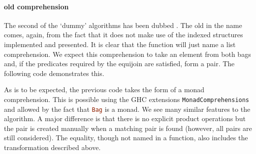 \paragraph{old comprehension} The second of the `dummy' algorithms has been
dubbed \oldcomprehension{}. The old in the name comes, again, from the fact that
it does not make use of the indexed structures implemented and presented. It is
clear that the function will just name a list comprehension. We expect this
comprehension to take an element from both bags and, if the predicates required
by the equijoin are satisfied, form a pair. The following code demonstrates
this.



\noindent
As is to be expected, the previous code takes the form of a monad comprehension.
This is possible using the GHC extensions \verb|MonadComprehensions| and allowed by
the fact that \lstinline[language=Haskell]{Bag} is a monad. We see many similar
features to the \modularproduct{} algorithm. A major difference is that there is
no explicit product operations but the pair is created manually when a matching
pair is found (however, all pairs are still considered). The equality, though
not named in a function, also includes the transformation described above.
